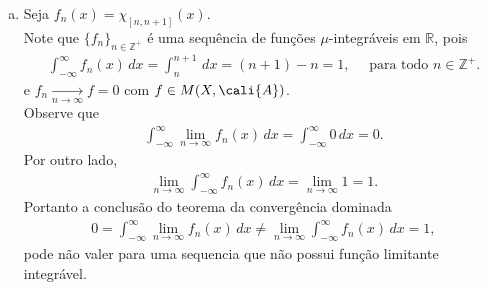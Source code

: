 \begin{homeworkProblem}[2]
\begin{solution}
\begin{enumerate}[a)]
\begin{align*}
      \end{align*}
      Portanto a conclusão do lema de Fatou
      \begin{align*}
        0=\int_{-\infty}^{\infty}\liminf f_n(x)\,dx\not{\leq} \liminf \int_{-\infty}^{\infty}f_n(x)\,dx=-1,
      \end{align*}
      pode não valerpara uma sequência de funções que não é positiva.
    \item Seja $f_n(x)=\chi_{[n,n+1]}(x)$.\\
      Note que $\{f_n\}_{n\in\mathbb{Z}^{+}}$ é uma sequência de funções $\mu$-integráveis em $\mathbb{R}$, pois
      \begin{align*}
        \int_{-\infty}^{\infty}f_n(x)\,dx=\int_{n}^{n+1}\,dx=(n+1)-n=1,\quad\text{ para todo }n\in\mathbb{Z}^{+}.
      \end{align*}
      e $f_n\xrightarrow[n\to\infty]{}f=0$ com $f\in M(X,\cali{A})$.\\
      Observe que
      \begin{align*}
        \int_{-\infty}^{\infty}\lim_{n \to \infty}f_n(x)\,dx=\int_{-\infty}^{\infty}0\,dx=0.
      \end{align*}
      Por outro lado,
      \begin{align*}
        \lim_{n \to \infty}\int_{-\infty}^{\infty}f_n(x)\,dx=\lim_{n \to \infty}1=1.
      \end{align*}
      Portanto a conclusão do teorema da convergência dominada
      \begin{align*}
        0=\int_{-\infty}^{\infty}\lim_{n \to \infty}f_n(x)\,dx\neq \lim_{n \to \infty}\int_{-\infty}^{\infty}f_n(x)\,dx=1,
      \end{align*}
      pode não valer para uma sequencia que não possui função limitante integrável.
  \end{enumerate} 
  \end{solution}
\end{homeworkProblem}
